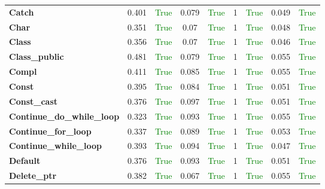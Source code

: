 \documentclass{article}
\begin{document}
\begin{xltabular}{\textwidth}{lcccccccc}
\textbf{{\fontsize{10}{12}\selectfont Catch}}& 0.401&\textcolor{green}{True}& 0.079&\textcolor{green}{True}& 1&\textcolor{green}{True}& 0.049&\textcolor{green}{True} \\[0.5ex]
\textbf{{\fontsize{10}{12}\selectfont Char}}& 0.351&\textcolor{green}{True}& 0.07&\textcolor{green}{True}& 1&\textcolor{green}{True}& 0.048&\textcolor{green}{True} \\[0.5ex]
\textbf{{\fontsize{10}{12}\selectfont Class}}& 0.356&\textcolor{green}{True}& 0.07&\textcolor{green}{True}& 1&\textcolor{green}{True}& 0.046&\textcolor{green}{True} \\[0.5ex]
\textbf{{\fontsize{10}{12}\selectfont Class\_public}}& 0.481&\textcolor{green}{True}& 0.079&\textcolor{green}{True}& 1&\textcolor{green}{True}& 0.055&\textcolor{green}{True} \\[0.5ex]
\textbf{{\fontsize{10}{12}\selectfont Compl}}& 0.411&\textcolor{green}{True}& 0.085&\textcolor{green}{True}& 1&\textcolor{green}{True}& 0.055&\textcolor{green}{True} \\[0.5ex]
\textbf{{\fontsize{10}{12}\selectfont Const}}& 0.395&\textcolor{green}{True}& 0.084&\textcolor{green}{True}& 1&\textcolor{green}{True}& 0.051&\textcolor{green}{True} \\[0.5ex]
\textbf{{\fontsize{10}{12}\selectfont Const\_cast}}& 0.376&\textcolor{green}{True}& 0.097&\textcolor{green}{True}& 1&\textcolor{green}{True}& 0.051&\textcolor{green}{True} \\[0.5ex]
\textbf{{\fontsize{10}{12}\selectfont Continue\_do\_while\_loop}}& 0.323&\textcolor{green}{True}& 0.093&\textcolor{green}{True}& 1&\textcolor{green}{True}& 0.055&\textcolor{green}{True} \\[0.5ex]
\textbf{{\fontsize{10}{12}\selectfont Continue\_for\_loop}}& 0.337&\textcolor{green}{True}& 0.089&\textcolor{green}{True}& 1&\textcolor{green}{True}& 0.053&\textcolor{green}{True} \\[0.5ex]
\textbf{{\fontsize{10}{12}\selectfont Continue\_while\_loop}}& 0.393&\textcolor{green}{True}& 0.094&\textcolor{green}{True}& 1&\textcolor{green}{True}& 0.047&\textcolor{green}{True} \\[0.5ex]
\textbf{{\fontsize{10}{12}\selectfont Default}}& 0.376&\textcolor{green}{True}& 0.093&\textcolor{green}{True}& 1&\textcolor{green}{True}& 0.051&\textcolor{green}{True} \\[0.5ex]
\textbf{{\fontsize{10}{12}\selectfont Delete\_ptr}}& 0.382&\textcolor{green}{True}& 0.067&\textcolor{green}{True}& 1&\textcolor{green}{True}& 0.055&\textcolor{green}{True} \\[0.5ex]

\end{xltabular}
\end{document}
